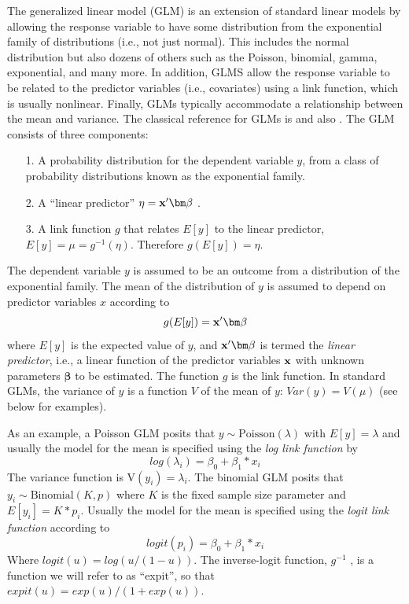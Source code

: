 The generalized linear model (GLM) is an extension of standard linear
models by allowing the response
variable to have some distribution from the exponential family of
distributions (i.e., not just normal). This includes the normal
distribution but also dozens of others such as the Poisson, binomial,
gamma, exponential, and many more. In addition, GLMS allow the
response variable to be related to the predictor variables (i.e.,
covariates) using a
link function, which is usually nonlinear.  Finally, GLMs typically
accommodate a relationship between the mean and variance. The
classical reference for GLMs is \citet{nelder_wedderburn:1972} and
also \citet{mccullagh_nelder:1989}.
The GLM consists of three components:
\begin{itemize}
\item[1.] A probability distribution for the dependent variable $y$,
from a class of probability distributions known as the exponential family.
\item[2.] A ``linear predictor'' $\eta = {\bf x}'{\bm \beta}$  .
\item[3.] A link function $g$ that relates $E[y]$ to the linear predictor, $E[y] = \mu = g^{-1}(\eta)$. Therefore $g(E[y]) = \eta$.
\end{itemize}

The dependent variable $y$ is assumed to be an outcome from a
distribution of the exponential family. The mean of the distribution of $y$ is assumed to depend on predictor variables $x$ according to
\[
 g(E[y]) = {\bf x}'{\bm \beta}
\]
where $E[y]$ is the expected value of $y$, and ${\bf x}'{\bm \beta}$
is termed the {\it linear predictor}, i.e., a linear function of the
predictor variables ${\bf x}$ with unknown parameters ${\bm \beta}$ to be
estimated.  The function $g$ is the link function. In standard GLMs,
the variance of $y$ is a function $V$ of the mean of $y$: $Var(y) =
V(\mu)$ (see below for examples).

As an example, a Poisson GLM posits that $y \sim \mbox{Poisson}(\lambda)$ with $E[y]
=\lambda$ and usually the model for the mean is specified using the
{\it log link function} by
\[
log(\lambda_{i}) = \beta_0 + \beta_{1}*x_{i}
\]
The variance function is $\mbox{V}(y_{i}) = \lambda_{i}$.  The
binomial GLM posits that $y_{i} \sim \mbox{Binomial}(K,p)$ where $K$
is the fixed sample size parameter and $E[y_{i}] = K*p_{i}$. Usually
the model for the mean is specified using the {\it logit link
  function} according to
\[
 logit(p_{i}) = \beta_{0} + \beta_{1}*x_{i}
\]
Where $logit(u) = log(u/(1-u))$.  The inverse-logit function, $g^{-1}$ ,
is a function we will refer to as ``expit'', so that $expit(u) =
exp(u)/(1+exp(u))$.

